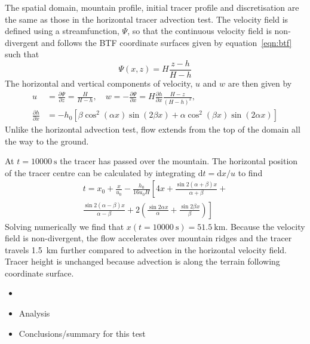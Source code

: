 \documentclass[twocol]{ametsoc}
\begin{document}
The spatial domain, mountain profile, initial tracer profile and discretisation are the same as those in the horizontal tracer advection test.  The velocity field is defined using a streamfunction, $\Psi$, so that the continuous velocity field is non-divergent and follows the BTF coordinate surfaces given by equation~\ref{eqn:btf} such that
\begin{equation}
	\Psi(x,z) = H \frac{z - h}{H - h}
\end{equation}
The horizontal and vertical components of velocity, $u$ and $w$ are then given by
\begin{align}
	u &= \frac{\partial \Psi}{\partial z} = \frac{H}{H - h}, \quad w = -\frac{\partial \Psi}{\partial x} = H \frac{\partial h}{\partial x} \frac{H - z}{\left( H - h \right)^2}, \nonumber \\
	\frac{\partial h}{\partial x} &= - h_0 \left[ 
		\beta \cos^2 \left( \alpha x \right) \sin \left( 2 \beta x \right) +
		\alpha \cos^2 \left( \beta x \right) \sin \left( 2 \alpha x \right)
	\right]
\end{align}
Unlike the horizontal advection test, flow extends from the top of the domain all the way to the ground.

At $t = \SI{10000}{\second}$ the tracer has passed over the mountain.  The horizontal position of the tracer centre can be calculated by integrating \(\mathrm{d}t = \mathrm{d}x / u\) to find
\begin{multline}
t = x_0 + \frac{x}{u_0} - \frac{h_0}{16 u_0 H} \left[ 4x + \frac{\sin 2 (\alpha + \beta) x}{\alpha + \beta} \right.+ \\
\left. \frac{\sin 2(\alpha - \beta) x}{\alpha - \beta} + 2 \left( \frac{\sin 2\alpha x}{\alpha} + \frac{\sin 2\beta x}{\beta} \right) \right]
\end{multline}
Solving numerically we find that \(x(t=\SI{10000}{\second}) = \SI{51.5}{\kilo\meter}\).  Because the velocity field is non-divergent, the flow accelerates over mountain ridges and the tracer travels \SI{1.5}{\kilo\meter} further compared to advection in the horizontal velocity field.  Tracer height is unchanged because advection is along the terrain following coordinate surface.

\begin{itemize}
	\item {}
	\item Analysis
	\item Conclusions/summary for this test
\end{itemize}
\end{document}

